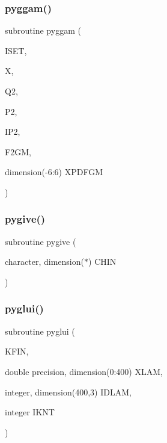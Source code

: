 \mbox{\label{pythia-6_84_824_8f_a5d921e74d5d3170e13e61189727bb8e4}} 
\subsubsection{\texorpdfstring{pyggam()}{pyggam()}}
{\footnotesize\ttfamily subroutine pyggam (\begin{DoxyParamCaption}\item[{}]{I\+S\+ET,  }\item[{}]{X,  }\item[{}]{Q2,  }\item[{}]{P2,  }\item[{}]{I\+P2,  }\item[{}]{F2\+GM,  }\item[{dimension(-\/6\+:6)}]{X\+P\+D\+F\+GM }\end{DoxyParamCaption})}

\mbox{\label{pythia-6_84_824_8f_a23504218b9f527cdb0d3421ecde9852e}} 
\subsubsection{\texorpdfstring{pygive()}{pygive()}}
{\footnotesize\ttfamily subroutine pygive (\begin{DoxyParamCaption}\item[{character, dimension($\ast$)}]{C\+H\+IN }\end{DoxyParamCaption})}

\mbox{\label{pythia-6_84_824_8f_a0e8de9275c7066b56e9cc2704eda4d9b}} 
\subsubsection{\texorpdfstring{pyglui()}{pyglui()}}
{\footnotesize\ttfamily subroutine pyglui (\begin{DoxyParamCaption}\item[{}]{K\+F\+IN,  }\item[{double precision, dimension(0\+:400)}]{X\+L\+AM,  }\item[{integer, dimension(400,3)}]{I\+D\+L\+AM,  }\item[{integer}]{I\+K\+NT }\end{DoxyParamCaption})}

